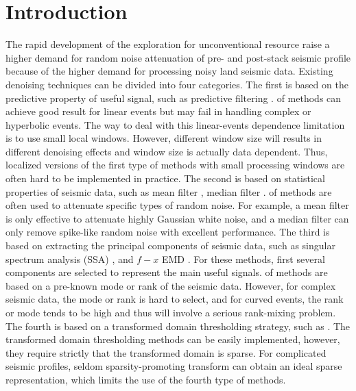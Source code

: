 \section{Introduction}
The rapid development of the exploration for unconventional resource raise a higher demand for random noise attenuation of pre- and post-stack seismic profile because of the higher demand for processing noisy land seismic data. Existing denoising techniques can be divided into four categories. The first is based on the predictive property of useful signal, such as predictive filtering \cite[]{canales,abma1995,yanghua1999,guochang2012,yangkang20132}.  of methods can achieve good result for linear events but may fail in handling complex or hyperbolic events. The way to deal with this linear-events dependence limitation is to use small local windows. However, different window size will results in different denoising effects and window size is actually data dependent. Thus, localized versions of the first type of methods with small processing windows are often hard to be implemented in practice. The second is based on statistical properties of seismic data, such as mean filter \cite[]{nlm}, median filter \cite[]{yangkang2014svmf,yangkang2014nmo}.  of methods are often used to attenuate specific types of random noise. For example, a mean filter is only effective to attenuate highly Gaussian white noise, and a median filter can only remove spike-like random noise with excellent performance. The third is based on extracting the principal components of seismic data, such as singular spectrum analysis (SSA) \cite[]{mssa,yangkang2014eage1}, and $f-x$ EMD \cite[]{bekara,yangkang2014emdsum}. For these methods, first several components are selected to represent the main useful signals.  of methods are based on a pre-known mode or rank of the seismic data. However, for complex seismic data, the mode or rank is hard to select, and for curved events, the rank or mode tends to be high and thus will involve a serious rank-mixing problem. The fourth is based on a transformed domain thresholding strategy, such as  \cite{wavelet,curvelet,seislet,yangkang20142}. The transformed domain thresholding methods can be easily implemented, however, they require strictly that the transformed domain is sparse. For complicated seismic profiles, seldom sparsity-promoting transform can obtain an ideal sparse representation, which limits the use of the fourth type of methods.  

